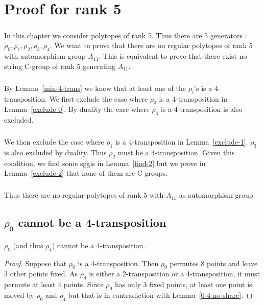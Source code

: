 \chapter{Proof for rank 5}

\paragraph{}
In this chapter we consider polytopes of rank 5. Thus there are 5 generators : $\rho_0, \rho_1, \rho_2, \rho_3, \rho_4$. We want to prove that there are no regular polytopes of rank 5 with automorphism group $A_{11}$. This is equivalent to prove that there exist no string C-group of rank 5 generating $A_{11}$.

\paragraph{}
By Lemma~\ref{min-4-trans} we know that at least one of the $\rho_i$'s is a 4-transposition. We first exclude the case where $\rho_0$ is a 4-transposition in Lemma~\ref{exclude-0}. By duality the case where $\rho_4$ is a 4-transposition is also excluded.

\paragraph{}
We then exclude the case where $\rho_1$ is a 4-transposition in Lemma~\ref{exclude-1}. $\rho_3$ is also excluded by duality. Thus $\rho_2$ must be a 4-transposition. Given this condition, we find some sggis in Lemma~\ref{find-2} but we prove in Lemma~\ref{exclude-2} that none of them are C-groups.

\paragraph{}
Thus there are no regular polytopes of rank 5 with $A_{11}$ as automorphism group.

\section{$\rho_0$ cannot be a 4-transposition}

\begin{lemma}
  \label{exclude-0}
  $\rho_0$ (and thus $\rho_4$) cannot be a 4-transposition.
\end{lemma}

\begin{proof}
  Suppose that $\rho_0$ is a 4-transposition. Then $\rho_0$ permutes 8 points and leave 3 other points fixed. As $\rho_4$ is either a 2-transposition or a 4-transposition, it must permute at least 4 points. Since $\rho_0$ has only 3 fixed points, at least one point is moved by $\rho_0$ and $\rho_4$ but that is in contradiction with Lemma~\ref{0-4-no-share}.
\end{proof}
